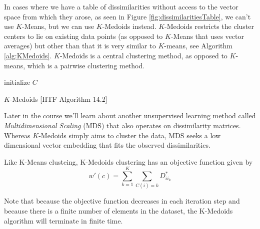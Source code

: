 \documentclass[a4paper]{article}
\begin{document}
In cases where we have a table of dissimilarities without access to the vector space from which they arose, as seen in Figure \ref{fig:dissimilaritiesTable}, we can't use $K$-Means, but we can use $K$-Medoids instead. $K$-Medoids restricts the cluster centers to lie on existing data points (as opposed to $K$-Means that uses vector averages) but other than that it is very similar to $K$-means, see Algorithm \ref{alg:KMedoids}. $K$-Medoids is a central clustering method, as opposed to $K$-means, which is a pairwise clustering method.

\begin{algorithm}
 initialize $C$\;
 \caption{$K$-Medoids [HTF Algorithm 14.2]}
 \label{alg:KMedoids}
\end{algorithm}

Later in the course we'll learn about another unsupervised learning method called \emph{Multidimensional Scaling} (MDS) that also operates on dissimilarity matrices.  Whereas $K$-Medoids simply aims to cluster the data, MDS seeks a low dimensional vector embedding that fits the observed dissimilarities.

Like K-Means clusteing, K-Medoids clustering has an objective function given by 
$$w'(c) = \sum_{k=1}^{K}\sum_{C(i) = k} D_{ii_{k}}^*$$

Note that because the objective function decreases in each iteration step and because there is a finite number of elements in the dataset, the K-Medoids algorithm will terminate in finite time.
\end{document}
